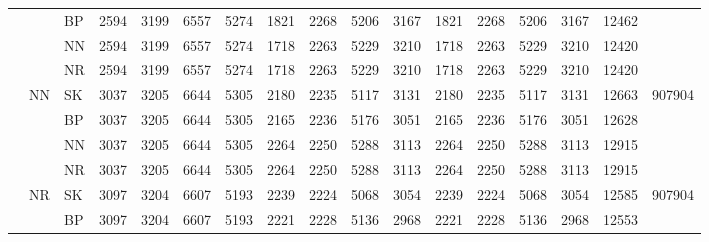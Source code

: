 \documentclass[../main/main.tex]{subfiles}
\begin{document}
\begin{table}
\begin{adjustbox}{max width=\textwidth}
\begin{threeparttable}
\begin{tabular}{cllcccccccccccccc}
                \\
                       &      & BP   &
                2594   & 3199 & 6557 & 5274 &
                1821   & 2268 & 5206 & 3167 &
                1821   & 2268 & 5206 & 3167 &
                12462  &
                \\
                       &      & NN   &
                2594   & 3199 & 6557 & 5274 &
                1718   & 2263 & 5229 & 3210 &
                1718   & 2263 & 5229 & 3210 &
                12420  &
                \\
                       &      & NR   &
                2594   & 3199 & 6557 & 5274 &
                1718   & 2263 & 5229 & 3210 &
                1718   & 2263 & 5229 & 3210 &
                12420  &
                \\ \cmidrule(lr){2-17}
                       & \multirow{4}{*}{NN}     & SK   &
                3037   & 3205                    & 6644 & 5305 &
                2180   & 2235                    & 5117 & 3131 &
                2180   & 2235                    & 5117 & 3131 &
                12663  & \multirow{4}{*}{907904}
                \\
                       &      & BP   &
                3037   & 3205 & 6644 & 5305 &
                2165   & 2236 & 5176 & 3051 &
                2165   & 2236 & 5176 & 3051 &
                12628  &
                \\
                       &      & NN   &
                3037   & 3205 & 6644 & 5305 &
                2264   & 2250 & 5288 & 3113 &
                2264   & 2250 & 5288 & 3113 &
                12915  &
                \\
                       &      & NR   &
                3037   & 3205 & 6644 & 5305 &
                2264   & 2250 & 5288 & 3113 &
                2264   & 2250 & 5288 & 3113 &
                12915  &
                \\ \cmidrule(lr){2-17}
                       & \multirow{4}{*}{NR}     & SK   &
                3097   & 3204                    & 6607 & 5193 &
                2239   & 2224                    & 5068 & 3054 &
                2239   & 2224                    & 5068 & 3054 &
                12585  & \multirow{4}{*}{907904}
                \\
                       &      & BP   &
                3097   & 3204 & 6607 & 5193 &
                2221   & 2228 & 5136 & 2968 &
                2221   & 2228 & 5136 & 2968 &
                12553  &
                \\

\end{tabular}
\end{threeparttable}
\end{adjustbox}
\end{table}
\end{document}
